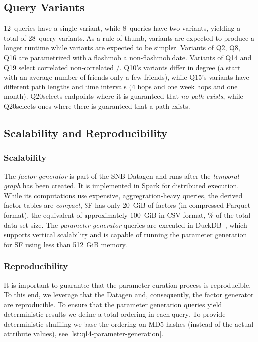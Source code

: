 \subsection{Query Variants}
\label{sec:query-variants}

12~queries have a single variant, while 8~queries have two variants, yielding a total of 28~query variants.
As a rule of thumb, variants \variantA are expected to produce a longer runtime
while variants \variantB are expected to be simpler.
Variants of Q2, Q8, Q16 are parametrized with a flashmob \vs a non-flashmob date.
Variants of Q14 and Q19 select correlated \vs non-correlated \tCountries/\tCities.
Q10's variants differ in degree (a start \tPerson with an average number of friends \vs only a few friends), while
Q15's variants have different path lengths and time intervals (4 hops and one week  hops and one month).
Q20\variantA selects endpoints where it is guaranteed that \emph{no path exists}, while Q20\variantB selects ones where there is guaranteed that a path exists.

\subsection{Scalability and Reproducibility}
\label{sec:paramgen-scalability}


\subsubsection{Scalability}
The \emph{factor generator} is part of the SNB Datagen and runs after the \textit{temporal graph} has been created.
It is implemented in Spark for distributed execution.
While its computations use expensive, aggregration-heavy queries, the derived factor tables are \emph{compact}, \eg SF has only 20~GiB of factors (in compressed Parquet format), the equivalent of approximately 100~GiB in CSV format, \% of the total data set size.
The \emph{parameter generator} queries are executed in DuckDB~\cite{DBLP:conf/sigmod/RaasveldtM19},
which supports vertical scalability and is capable of running the parameter generation for SF using less than 512~GiB memory.



\subsubsection{Reproducibility}
It is important to guarantee that the parameter curation process is reproducible.
To this end, we leverage that the Datagen and, consequently, the factor generator are reproducible.
To ensure that the parameter generation queries yield deterministic results we define a total ordering in each query.
To provide deterministic shuffling we base the ordering on MD5 hashes (instead of the actual attribute values), see \autoref{lst:q14-parameter-generation}.

